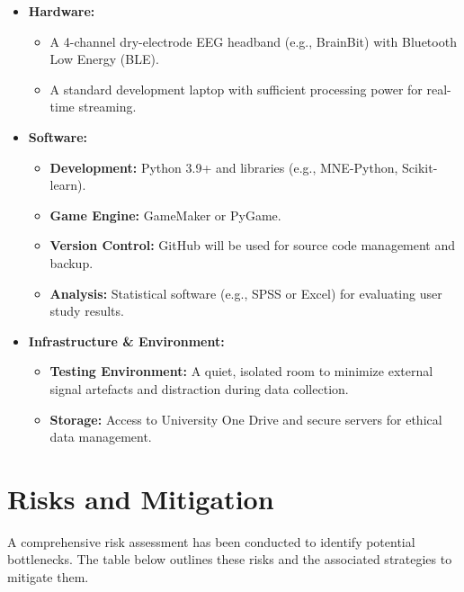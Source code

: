 \documentclass[a4paper, 11pt, openany]{report}
\begin{document}
        \begin{itemize}
            \item \textbf{Hardware:} 
            \begin{itemize}
                \item A 4-channel dry-electrode EEG headband (e.g., BrainBit) with Bluetooth Low Energy (BLE).
                \item A standard development laptop with sufficient processing power for real-time streaming.
            \end{itemize}

            \item \textbf{Software:} 
            \begin{itemize}
                \item \textbf{Development:} Python 3.9+ and libraries (e.g., MNE-Python, Scikit-learn).
                \item \textbf{Game Engine:} GameMaker or PyGame.
                \item \textbf{Version Control:} GitHub will be used for source code management and backup.
                \item \textbf{Analysis:} Statistical software (e.g., SPSS or Excel) for evaluating user study results.
            \end{itemize}

            \item \textbf{Infrastructure \& Environment:} 
            \begin{itemize}
                \item \textbf{Testing Environment:} A quiet, isolated room to minimize external signal artefacts and distraction during data collection.
                \item \textbf{Storage:} Access to University One Drive and secure servers for ethical data management.
            \end{itemize}
        \end{itemize}

    \section{Risks and Mitigation}
        A comprehensive risk assessment has been conducted to identify potential 
        bottlenecks. The table below outlines these risks and the associated 
        strategies to mitigate them.
\end{document}
